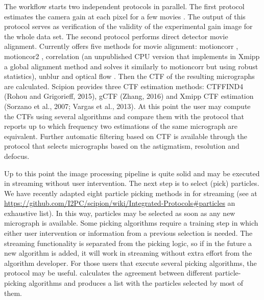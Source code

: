 The workflow starts two independent protocols in parallel. The first protocol estimates the camera gain at each pixel for a few  movies \citep{sorzano2018}. %
The output of this protocol serves as verification of the validity of the experimental gain image for the whole data set. The second protocol performs direct detector movie alignment. Currently \scipion offers  five  methods for movie alignment: motioncorr \citep{Li2015}, motioncor2 \citep{Zheng2016:motioncor2}, correlation (an unpublished CPU version that implements in Xmipp a global alignment method and solves it similarly to motioncorr but using robust statistics), unblur \citep{Grant2015:unblur} and optical flow \citep{Abrishami2015:optical-flow}. Then the CTF of the resulting micrographs are calculated. Scipion provides three CTF estimation methods:
CTFFIND4 (Rohou and Grigorieff, 2015), gCTF (Zhang, 2016) and Xmipp CTF estimation (Sorzano et al., 2007; Vargas et al., 2013). At this point the user may compute the CTFs using several algorithms and compare them with the protocol  that reports up to which frequency two estimations of the same micrograph are equivalent. Further automatic filtering based on CTF is available through the protocol  that selects micrographs based on the astigmatism, resolution and defocus. %

Up to this point the image processing pipeline is quite solid and may be executed in streaming without user intervention. The next step is to select (pick) particles. We have recently adapted eight particle picking methods in \scipion  for streaming (see at \url{https://github.com/I2PC/scipion/wiki/Integrated-Protocols#particles} an exhaustive list). In this way,  particles may be selected as soon as any new micrograph is available. Some picking algorithms require a training step in which either user intervention or information from a previous selection is needed. The streaming functionality is separated from the picking logic, so if in the future a new algorithm is added, it will work in streaming without extra effort from the algorithm developer. For those users that execute several picking algorithms, the protocol  may be useful.   calculates the agreement between different particle-picking algorithms and produces a list with the particles selected by most of them.

